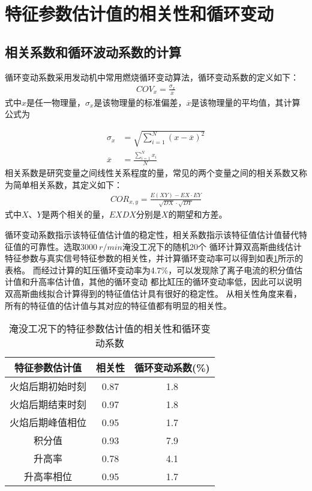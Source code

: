 \section{特征参数估计值的相关性和循环变动}
\subsection{相关系数和循环波动系数的计算}
循环变动系数\cite{xhbd}采用发动机中常用燃烧循环变动算法，循环变动系数的定义如下：
\begin{align}
	COV_x = \frac{\sigma_x}{\overline{x}}
\end{align}
式中$x$是任一物理量，$\sigma_x$是该物理量的标准偏差，$\overline{x}$是该物理量的平均值，其计算公式为\par
\begin{align}
	\sigma_x &= \sqrt{\sum_{i=1}^{N}(x-\overline{x})^2}\\
	\overline{x} &= \frac{\sum_{i=1}^{N}x_i}{N}
\end{align}
相关系数是研究变量之间线性关系程度的量，常见的两个变量之间的相关系数又称为简单相关系数，其定义如下：
\begin{align}
	COR_{x,y} = \frac{E(XY)-EX\cdot EY}{\sqrt{DX}\cdot\sqrt{DY}}
\end{align}
式中$X$、$Y$是两个相关的量，$EX$$DX$分别是$X$的期望和方差。\par
循环变动系数指示该特征值估计值的稳定性，相关系数指示该特征值估计值替代特征值的可靠性。选取$\SI{3000}{r/min}$淹没工况下的随机20个
循环计算双高斯曲线估计特征参数与真实信号特征参数的相关性，并计算循环变动率可以得到如表\ref{tab:parainfo}所示的表格。
而经过计算的缸压循环变动率为4.7\%，可以发现除了离子电流的积分值估计值和升高率估计值，其他的循环变动
都比缸压的循环变动率低，因此可以说明双高斯曲线拟合计算得到的特征值估计具有很好的稳定性\cite{ljw2005}。
从相关性角度来看，所有的特征值的估计值与其对应的特征值都有明显的相关性\cite{joyce2006linear}。
\begin{table}[htb]
	\centering
	\caption{\label{tab:parainfo}淹没工况下的特征参数估计值的相关性和循环变动系数}
	\begin{tabular}{|c|c|c|}
		\hline
		特征参数估计值&相关性&循环变动系数(\%)\\\hline
		火焰后期初始时刻&0.87&1.8\\\hline
		火焰后期结束时刻&0.97&1.8\\\hline
		火焰后期峰值相位&0.95&1.7\\\hline
		积分值&0.93&7.9\\\hline
		升高率&0.78&4.1\\\hline
		升高率相位&0.95&1.7\\\hline
	\end{tabular}
\end{table}

